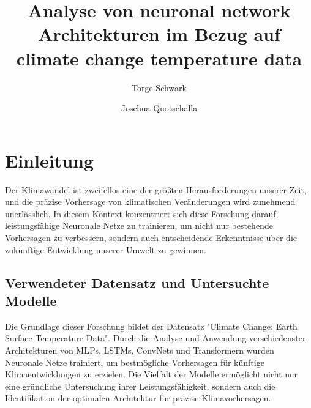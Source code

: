 \documentclass[manuscript,screen,review]{acmart}
\begin{document}
\title[Analyse von neuronal networks und climate change temperature data]{Analyse von neuronal network Architekturen im Bezug auf climate change temperature data}

\author{Torge Schwark}
\author{Joschua Quotschalla}
\authornotemark[1]





\maketitle


\section{Einleitung}
Der Klimawandel ist zweifellos eine der größten Herausforderungen unserer Zeit, und die präzise Vorhersage von klimatischen Veränderungen wird zunehmend unerlässlich. In diesem Kontext konzentriert sich diese Forschung darauf, leistungsfähige Neuronale Netze zu trainieren, um nicht nur bestehende Vorhersagen zu verbessern, sondern auch entscheidende Erkenntnisse über die zukünftige Entwicklung unserer Umwelt zu gewinnen.

\subsection{Verwendeter Datensatz und Untersuchte Modelle}
Die Grundlage dieser Forschung bildet der Datensatz "Climate Change: Earth Surface Temperature Data". Durch die Analyse und Anwendung verschiedenster Architekturen von MLPs, LSTMs, ConvNets und Transformern wurden Neuronale Netze trainiert, um bestmögliche Vorhersagen für künftige Klimaentwicklungen zu erzielen. Die Vielfalt der Modelle ermöglicht nicht nur eine gründliche Untersuchung ihrer Leistungsfähigkeit, sondern auch die Identifikation der optimalen Architektur für präzise Klimavorhersagen.
\end{document}
